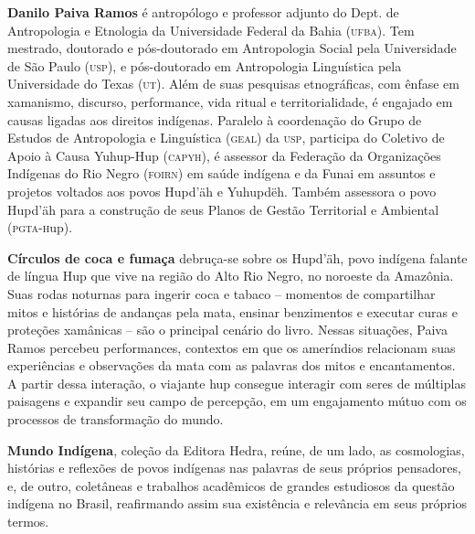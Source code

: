 \textbf{Danilo Paiva Ramos} é antropólogo e professor adjunto do Dept. de Antropologia e Etnologia da Universidade Federal da Bahia \textsc{(ufba)}. Tem mestrado, doutorado e pós-doutorado em Antropologia Social pela Universidade de São Paulo \textsc{(usp)}, e pós-doutorado em Antropologia Linguística pela Universidade do Texas \textsc{(ut)}. Além de suas pesquisas etnográficas, com ênfase em xamanismo, discurso, performance, vida ritual e territorialidade, é engajado em causas ligadas aos direitos indígenas. Paralelo à coordenação do Grupo de Estudos de Antropologia e Linguística \textsc{(geal)} da \textsc{usp}, participa do Coletivo de Apoio à Causa Yuhup-Hup \textsc{(capyh)}, é assessor da Federação da Organizações Indígenas do Rio Negro \textsc{(foirn)} em saúde indígena e da Funai em assuntos e projetos voltados aos povos Hupd'äh e Yuhupdëh. Também assessora o povo Hupd'äh para a construção de seus Planos de Gestão Territorial e Ambiental (\textsc{pgta-h}up).


\textbf{Círculos de coca e fumaça} debruça-se sobre os Hupd’äh, povo indígena falante de língua Hup que vive na região do Alto Rio Negro, no noroeste da Amazônia. Suas rodas noturnas para ingerir coca e tabaco -- momentos de compartilhar mitos e histórias de andanças pela mata, ensinar benzimentos e executar curas e proteções xamânicas -- são o principal cenário do livro. Nessas situações, Paiva Ramos percebeu performances, contextos em que os ameríndios relacionam suas experiências e observações da mata com as palavras dos mitos e encantamentos. A partir dessa interação, o viajante hup consegue interagir com seres de múltiplas paisagens e expandir seu campo de percepção, em um engajamento mútuo com os processos de transformação do mundo.


\textbf{Mundo Indígena}, coleção da Editora Hedra, reúne, de um lado, as cosmologias, histórias e reflexões de povos indígenas nas palavras de seus próprios pensadores, e, de outro, coletâneas e trabalhos acadêmicos de grandes estudiosos da questão indígena no Brasil, reafirmando assim sua existência e relevância em seus próprios termos.\par